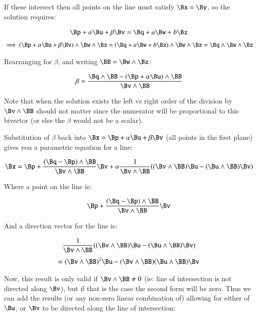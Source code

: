 If these intersect then all points on the line must satisfy $\Bx = \By$, so the solution requires:

\begin{align*}
\Bp + \alpha \Bu + \beta \Bv = \Bq + a \Bw + b \Bz
\end{align*}
\begin{align*}
\implies
(\Bp + \alpha \Bu + \beta \Bv) \wedge \Bw \wedge \Bz = (\Bq + a \Bw + b \Bz) \wedge \Bw \wedge \Bz = \Bq \wedge \Bw \wedge \Bz
\end{align*}

Rearranging for $\beta$, and writing $\BB = \Bw \wedge \Bz$:

\begin{align*}
\beta = \frac{\Bq \wedge \BB - (\Bp + \alpha \Bu) \wedge \BB}{\Bv \wedge \BB}
\end{align*}

Note that when the solution exists the left vs right order of the division by $\Bv \wedge \BB$ should not matter since the numerator will be proportional to this bivector (or else the $\beta$ would not be a scalar).

Substitution of $\beta$ back into $\Bx = \Bp + \alpha \Bu + \beta \Bv$ (all points in the first plane) gives you a parametric equation for a line:

\begin{align*}
\Bx = \Bp + \frac{(\Bq-\Bp)\wedge \BB}{\Bv \wedge \BB}\Bv + \alpha\frac{1}{\Bv \wedge \BB}((\Bv \wedge \BB) \Bu - (\Bu \wedge \BB)\Bv)
\end{align*}

Where a point on the line is:

\begin{align*}
\Bp + \frac{(\Bq-\Bp)\wedge \BB}{\Bv \wedge \BB}\Bv 
\end{align*}

And a direction vector for the line is:

\begin{align*}
\frac{1}{\Bv \wedge \BB}((\Bv \wedge \BB) \Bu - (\Bu \wedge \BB)\Bv)
\end{align*}
\begin{align*}
\propto
(\Bv \wedge \BB)^2 \Bu - (\Bv \wedge \BB)(\Bu \wedge \BB)\Bv
\end{align*}

Now, this result is only valid if $\Bv \wedge \BB \ne 0$ (ie: line of intersection is not directed along $\Bv$), but if that is the case the second form will be zero.  Thus we can add the results (or any non-zero linear combination of) allowing for either of $\Bu$, or $\Bv$ to be directed along the line of intersection:

